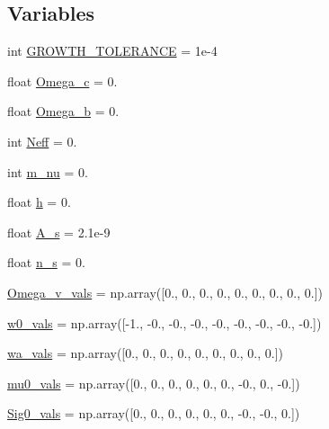 \subsection*{Variables}
\begin{DoxyCompactItemize}
\item 
int \mbox{\hyperlink{namespaceccl__test__growth_a2cd407292b4e5880bcd20380e4378960}{G\+R\+O\+W\+T\+H\+\_\+\+T\+O\+L\+E\+R\+A\+N\+CE}} = 1e-\/4
\item 
float \mbox{\hyperlink{namespaceccl__test__growth_a7008fc5d2176f6e0f875c5e6c709114d}{Omega\+\_\+c}} = 0.
\item 
float \mbox{\hyperlink{namespaceccl__test__growth_a46cff936ff2e830c74bd0b7d5d452f26}{Omega\+\_\+b}} = 0.
\item 
int \mbox{\hyperlink{namespaceccl__test__growth_a45bdb99d0f699c606d3d9161a75a0c79}{Neff}} = 0.
\item 
int \mbox{\hyperlink{namespaceccl__test__growth_aba28f9096317c4a2166ec5fd9a483373}{m\+\_\+nu}} = 0.
\item 
float \mbox{\hyperlink{namespaceccl__test__growth_a6fb889bb34b68e7f24fb4dba826884be}{h}} = 0.
\item 
float \mbox{\hyperlink{namespaceccl__test__growth_ae7c040656adf879c79a4f0266f35e7e7}{A\+\_\+s}} = 2.\+1e-\/9
\item 
float \mbox{\hyperlink{namespaceccl__test__growth_aefd3ff5bb306877374f5351d2df5f8fc}{n\+\_\+s}} = 0.
\item 
\mbox{\hyperlink{namespaceccl__test__growth_a4abfc4891b595cd9d894d978c4ce89f0}{Omega\+\_\+v\+\_\+vals}} = np.\+array(\mbox{[}0., 0., 0., 0., 0., 0., 0., 0., 0.\mbox{]})
\item 
\mbox{\hyperlink{namespaceccl__test__growth_ab846706326cba20d21f5963cbe5af568}{w0\+\_\+vals}} = np.\+array(\mbox{[}-\/1., -\/0., -\/0., -\/0., -\/0., -\/0., -\/0., -\/0., -\/0.\mbox{]})
\item 
\mbox{\hyperlink{namespaceccl__test__growth_a3b5a7ad847705c7a11bd75b81a268e5f}{wa\+\_\+vals}} = np.\+array(\mbox{[}0., 0., 0., 0., 0., 0., 0., 0., 0.\mbox{]})
\item 
\mbox{\hyperlink{namespaceccl__test__growth_a2d2d3c3f2739df97770cb8dcc023466b}{mu0\+\_\+vals}} = np.\+array(\mbox{[}0., 0., 0., 0., 0., 0., -\/0., 0., -\/0.\mbox{]})
\item 
\mbox{\hyperlink{namespaceccl__test__growth_a917391583cc5f328ef9ab45e2669b6cc}{Sig0\+\_\+vals}} = np.\+array(\mbox{[}0., 0., 0., 0., 0., 0., -\/0., -\/0., 0.\mbox{]})
\end{DoxyCompactItemize}


